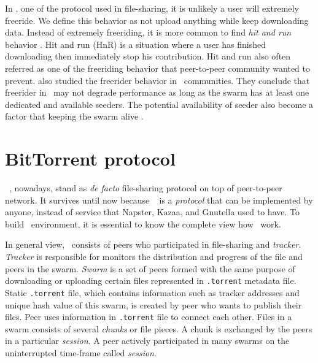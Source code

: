 In \bt, one of the protocol used in file-sharing, it is unlikely a user will extremely freeride. We define this behavior as not upload anything while keep downloading data. Instead of extremely freeriding, it is more common to find \textit{hit and run} behavior \cite{2011:managesupplydemand:meulpolder}. Hit and run (HnR) is a situation where a user has finished downloading then immediately stop his contribution. Hit and run also often referred as one of the freeriding behavior that peer-to-peer community wanted to prevent. \citeauthor{2015:freeriderinbtcommunity:das} also studied the freerider behavior in \bt~communities. They conclude that freerider in \bt~may not degrade performance as long as the swarm has at least one dedicated and available seeders. The potential availability of seeder also become a factor that keeping the swarm alive \cite{2015:freeriderinbtcommunity:das}. 

\section{BitTorrent protocol}
\bt~\cite{2003:bittorrent:cohen}, nowadays, stand as \textit{de facto} file-sharing protocol on top of peer-to-peer network. It survives until now because \bt~ is a \textit{protocol} that can be implemented by anyone, instead of service that Napster, Kazaa, and Gnutella used to have. To build \bt~environment, it is essential to know the complete view how \bt~work. 

In general view, \bt~consists of peers who participated in file-sharing and \textit{tracker}. \textit{Tracker} is responsible for monitors the distribution and progress of the file and peers in the swarm. \textit{Swarm} is a set of peers formed with the same purpose of downloading or uploading certain files represented in \texttt{.torrent} metadata file. Static \texttt{.torrent} file, which contains information such as tracker addresses and unique hash value of this swarm, is created by peer who wants to publish their files. Peer uses information in \texttt{.torrent} file to connect each other. Files in a swarm consists of several \textit{chunks} or file pieces. A chunk is exchanged by the peers in a particular \textit{session}. A peer actively participated in many swarms on the uninterrupted time-frame called \textit{session}. 

